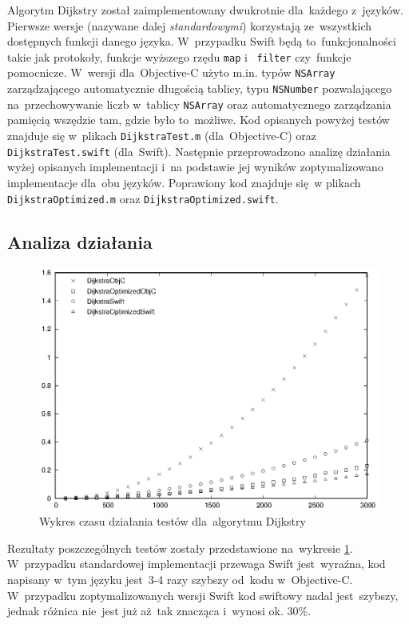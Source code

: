 \documentclass[mgr, shortabstract]{iithesis}
\newcommand{\swiftinline}[1]{
    \texttt{#1}
}
\newcommand{\objcinline}[1]{
    \texttt{#1}
}
\begin{document}
Algorytm Dijkstry został zaimplementowany dwukrotnie dla~każdego z~języków. Pierwsze wersje (nazywane dalej \textit{standardowymi}) korzystają ze~wszystkich dostępnych funkcji danego języka. W~przypadku Swift będą to~funkcjonalności takie jak protokoły, funkcje wyższego rzędu \swiftinline{map} i~\swiftinline{filter} czy~funkcje pomocnicze. W~wersji dla~Objective-C użyto m.in. typów \objcinline{NSArray} zarządzającego automatycznie długością tablicy, typu \objcinline{NSNumber} pozwalającego na~przechowywanie liczb w~tablicy \objcinline{NSArray} oraz automatycznego zarządzania pamięcią wszędzie tam, gdzie było to~możliwe. Kod opisanych powyżej testów znajduje się w~plikach \texttt{DijkstraTest.m} (dla~Objective-C) oraz \texttt{DijkstraTest.swift} (dla~Swift). Następnie przeprowadzono analizę działania wyżej opisanych implementacji i~na podstawie jej wyników zoptymalizowano implementacje dla~obu języków. Poprawiony kod znajduje się w plikach \texttt{DijkstraOptimized.m} oraz \texttt{DijkstraOptimized.swift}.

\subsection{Analiza działania}

\begin{figure}
    \includegraphics{plots/Dijkstra}
    \caption{Wykres czasu działania testów dla~algorytmu Dijkstry}
    \label{p:dijkstra}
\end{figure}

Rezultaty poszczególnych testów zostały przedstawione na~wykresie \ref{p:dijkstra}. W~przypadku standardowej implementacji przewaga Swift jest~wyraźna, kod napisany w~tym języku jest~3-4 razy szybszy od~kodu w~Objective-C. W~przypadku zoptymalizowanych wersji Swift kod swiftowy nadal jest~szybszy, jednak różnica nie~jest już aż~tak znacząca i~wynosi ok. 30\%.
\end{document}
